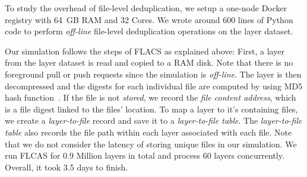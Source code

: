 To study the overhead of file-level deduplication, we setup a
one-node Docker registry with 64~GB RAM and 32 Cores.  
%
We wrote around 600 lines of Python code to perform \emph{off-line} file-level deduplication
operations on the layer dataset.
%

% 

Our simulation follows the steps of FLACS as explained above:
First, a layer from the layer dataset is read and copied
to a RAM disk. 
Note that there is no foreground pull or push requests since the simulation is \emph{off-line}.
The layer is then decompressed and 
the digests for each individual file are computed by using MD5 hash function~\cite{MD5}.
%
If the file is not \emph{stored},
we record the \emph{file content address}, which is a
file digest linked to the files' location.
%
To map a layer to it's containing files, we create a \emph{layer-to-file} record
and save it
to a \emph{layer-to-file table}.
%
The \emph{layer-to-file table} also
records the file path within each layer associated with each file.
%
Note that we do not consider the latency of storing unique files in our simulation.
%
%
We run FLCAS for 0.9 Million layers in total and process 60 layers concurrently. 
%
Overall, it took 3.5 days to finish.
%
%

%
%
%
%

